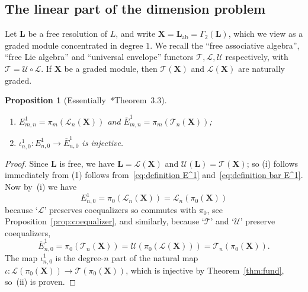 \documentclass[a4paper,reqno,notitlepage]{amsart}
\newtheorem{prop}[theorem]{Proposition}
\theoremstyle{definition}
\newcommand\U{\mathscr U}
\begin{document}
\subsection{The linear part of the dimension problem}
Let $\mathbf L$ be a free resolution of $L$, and write $\mathbf
X=\mathbf L_{\text{ab}}=\Gamma_2(\mathbf L)$, which we view as a
graded module concentrated in degree $1$. We recall the ``free
associative algebra'', ``free Lie algebra'' and ``universal envelope''
functors $\mathscr T,\mathscr L,\U$ respectively, with $\mathscr
T=\mathscr U\circ\mathscr L$. If $\mathbf X$ be a graded module, then
$\mathscr T(\mathbf X)$ and $\mathscr L(\mathbf X)$ are naturally
graded.

\begin{prop}[Essentially~\cite{Gruenenfelder:80}*{Theorem~3.3}]\label{prop:iota injective}\verb+ +
  \begin{enumerate}\def\theenumi{\roman{enumi}}
  \item $E^1_{m,n}=\pi_m(\mathscr L_n(\mathbf X))$ and $\overline
    E^1_{m,n}=\pi_m(\mathscr T_n(\mathbf X))$;
  \item $\iota^1_{n,0}:E^1_{n,0}\to\overline E^1_{n,0}$ is injective.
  \end{enumerate}
\end{prop}
\begin{proof}
  Since $\mathbf L$ is free, we have $\mathbf L=\mathscr L(\mathbf X)$
  and $\U(\mathbf L)=\mathscr T(\mathbf X)$; so (i) follows
  immediately from (1) follows from~\eqref{eq:definition E^1}
  and~\eqref{eq:definition bar E^1}.  Now by~(i) we have
  \[E^1_{n,0}=\pi_0(\mathscr L_n(\mathbf X))=\mathscr L_n(\pi_0(\mathbf X))
  \]
  because `$\mathscr L$' preserves coequalizers so commutes with
  $\pi_0$, see Proposition~\ref{prop:coequalizer}, and similarly, because
  `$\mathscr T$' and `$\U$' preserve coequalizers,
  \[\overline E^1_{n,0}=\pi_0(\mathscr T_n(\mathbf X))=\U(\pi_0(\mathscr L(\mathbf X)))=\mathscr T_n(\pi_0(\mathbf X)).
  \]
  The map $\iota^1_{n,0}$ is the degree-$n$ part of the natural map
  $\iota:\mathscr L(\pi_0(\mathbf X))\to\mathscr T(\pi_0(\mathbf X))$,
  which is injective by Theorem~\ref{thm:fund}, so~(ii) is proven.
\end{proof}
\end{document}
